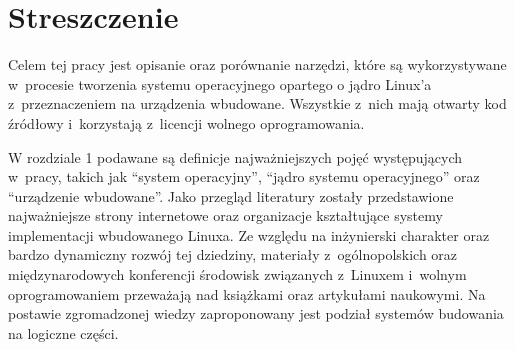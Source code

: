 \documentclass[printmode]{mgr}
\begin{document}
%
%
%
%




















\listoffigures

\listoftables

\chapter*{Streszczenie}
Celem tej pracy jest opisanie oraz porównanie narzędzi, które są wykorzystywane w~procesie tworzenia systemu operacyjnego opartego o jądro Linux'a z~przeznaczeniem na urządzenia wbudowane.
Wszystkie z~nich mają otwarty kod źródłowy i~korzystają z~licencji wolnego oprogramowania.

W rozdziale 1 podawane są definicje najważniejszych pojęć występujących w~pracy, takich jak ``system operacyjny'', ``jądro systemu operacyjnego'' oraz ``urządzenie wbudowane''.
Jako przegląd literatury zostały przedstawione najważniejsze strony internetowe oraz organizacje kształtujące systemy implementacji wbudowanego Linuxa.
Ze względu na inżynierski charakter oraz bardzo dynamiczny rozwój tej dziedziny, materiały z~ogólnopolskich oraz międzynarodowych konferencji środowisk związanych z~Linuxem i~wolnym oprogramowaniem przeważają nad książkami oraz artykułami naukowymi.
Na postawie zgromadzonej wiedzy zaproponowany jest podział systemów budowania na logiczne części.
\end{document}
